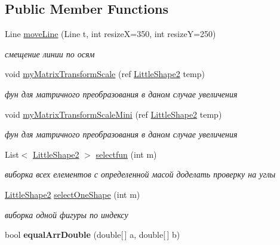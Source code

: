 \subsection*{Public Member Functions}
\begin{DoxyCompactItemize}
\item 
Line \hyperlink{classtwelve_1_1_main_window_a4b493a912c1d0cf8944ac182ac7a36bc}{move\+Line} (Line t, int resize\+X=350, int resize\+Y=250)
\begin{DoxyCompactList}\small\item\em смещение линии по осям \end{DoxyCompactList}\item 
void \hyperlink{classtwelve_1_1_main_window_a1bf7bff30ceb077bb52625461737dcf2}{my\+Matrix\+Transform\+Scale} (ref \hyperlink{classtwelve_1_1_little_shape2}{Little\+Shape2} temp)
\begin{DoxyCompactList}\small\item\em фун для матричного преобразования в даном случае увеличения \end{DoxyCompactList}\item 
void \hyperlink{classtwelve_1_1_main_window_a326cc47dfb711694b5cb01e9eb33db16}{my\+Matrix\+Transform\+Scale\+Mini} (ref \hyperlink{classtwelve_1_1_little_shape2}{Little\+Shape2} temp)
\begin{DoxyCompactList}\small\item\em фун для матричного преобразования в даном случае увеличения \end{DoxyCompactList}\item 
List$<$ \hyperlink{classtwelve_1_1_little_shape2}{Little\+Shape2} $>$ \hyperlink{classtwelve_1_1_main_window_aed30ff82251ce0f7896fbf22e23f406f}{selectfun} (int m)
\begin{DoxyCompactList}\small\item\em виборка всех елементов с определенной масой доделать проверку на углы \end{DoxyCompactList}\item 
\hyperlink{classtwelve_1_1_little_shape2}{Little\+Shape2} \hyperlink{classtwelve_1_1_main_window_acb1b0b5ccc4e94040a1eed2f10926f8e}{select\+One\+Shape} (int m)
\begin{DoxyCompactList}\small\item\em виборка одной фигуры по индексу \end{DoxyCompactList}\item 
\hypertarget{classtwelve_1_1_main_window_a6113105ef67052bc0b5598f02799a120}{}bool {\bfseries equal\+Arr\+Double} (double\mbox{[}$\,$\mbox{]} a, double\mbox{[}$\,$\mbox{]} b)\label{classtwelve_1_1_main_window_a6113105ef67052bc0b5598f02799a120}


\end{DoxyCompactItemize}
